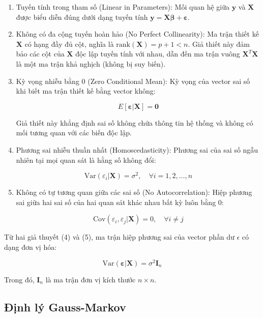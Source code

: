 \begin{enumerate}[topsep=0pt, itemsep=2.5pt, leftmargin=1.5cm]
    \item Tuyến tính trong tham số (Linear in Parameters): Mối quan hệ giữa $\mathbf{y}$ và $\mathbf{X}$ được biểu diễn đúng dưới dạng tuyến tính $\mathbf{y} = \mathbf{X}\boldsymbol{\beta} + \boldsymbol{\varepsilon}$.

    \item Không có đa cộng tuyến hoàn hảo (No Perfect Collinearity): Ma trận thiết kế $\mathbf{X}$ có hạng đầy đủ cột, nghĩa là $\text{rank}(\mathbf{X}) = p+1 < n$. Giả thiết này đảm bảo các cột của $\mathbf{X}$ độc lập tuyến tính với nhau, dẫn đến ma trận vuông $\mathbf{X}^T\mathbf{X}$ là một ma trận khả nghịch (không bị suy biến).

    \item Kỳ vọng nhiễu bằng 0 (Zero Conditional Mean): Kỳ vọng của vector sai số khi biết ma trận thiết kế bằng vector không:

    $$E[\boldsymbol{\varepsilon} | \mathbf{X}] = \mathbf{0}$$

    Giả thiết này khẳng định sai số không chứa thông tin hệ thống và không có mối tương quan với các biến độc lập.

    \item Phương sai nhiễu thuần nhất (Homoscedasticity): Phương sai của sai số ngẫu nhiên tại mọi quan sát là hằng số không đổi:

    $$\text{Var}(\varepsilon_i | \mathbf{X}) = \sigma^2, \quad \forall i = 1, 2, \dots, n$$

    \item Không có tự tương quan giữa các sai số (No Autocorrelation): Hiệp phương sai giữa hai sai số của hai quan sát khác nhau bất kỳ luôn bằng 0:
    
    $$\text{Cov}(\varepsilon_i, \varepsilon_j | \mathbf{X}) = 0, \quad \forall i \neq j$$
\end{enumerate}

Từ hai giả thuyết (4) và (5), ma trận hiệp phương sai của vector phần dư $\epsilon$ có dạng đơn vị hóa:

$$\text{Var}(\boldsymbol{\varepsilon} | \mathbf{X}) = \sigma^2 \mathbf{I}_n$$

Trong đó, $\mathbf{I}_n$ là ma trận đơn vị kích thước $n \times n$.

\subsection{Định lý Gauss-Markov}

